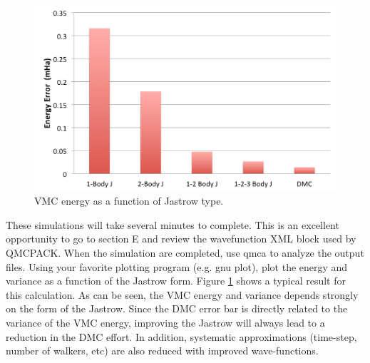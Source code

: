 \begin{figure}
\begin{center}
\includegraphics[trim = 0mm 0mm 0mm 0mm, clip,width=0.75\columnwidth]{./figures/lab_advanced_molecules_vmc_jastrow}
\end{center}
\caption{VMC energy as a function of Jastrow type.
\label{fig:lam_vmc_jastrow}
}
\end{figure}

These simulations will take several minutes to complete. This is an excellent opportunity
to go to section E and review the wavefunction XML block used by QMCPACK. When the
simulation are completed, use qmca to analyze the output files. Using your favorite plotting
program (e.g. gnu plot), plot the energy and variance as a function of the Jastrow form.
Figure \ref{fig:lam_vmc_jastrow} shows a typical result for this calculation. As can be seen, the VMC energy and
variance depends strongly on the form of the Jastrow. Since the DMC error bar is directly
related to the variance of the VMC energy, improving the Jastrow will always lead to a
reduction in the DMC effort. In addition, systematic approximations (time-step, number of
walkers, etc) are also reduced with improved wave-functions.


